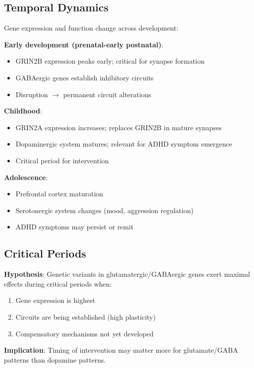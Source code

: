 \documentclass[12pt,letterpaper]{article}
\begin{document}
\subsection{Temporal Dynamics}

Gene expression and function change across development:

\textbf{Early development (prenatal-early postnatal)}:
\begin{itemize}
    \item GRIN2B expression peaks early; critical for synapse formation
    \item GABAergic genes establish inhibitory circuits
    \item Disruption $\rightarrow$ permanent circuit alterations
\end{itemize}

\textbf{Childhood}:
\begin{itemize}
    \item GRIN2A expression increases; replaces GRIN2B in mature synapses
    \item Dopaminergic system matures; relevant for ADHD symptom emergence
    \item Critical period for intervention
\end{itemize}

\textbf{Adolescence}:
\begin{itemize}
    \item Prefrontal cortex maturation
    \item Serotonergic system changes (mood, aggression regulation)
    \item ADHD symptoms may persist or remit
\end{itemize}

\subsection{Critical Periods}

\textbf{Hypothesis}: Genetic variants in glutamatergic/GABAergic genes exert maximal effects during critical periods when:
\begin{enumerate}
    \item Gene expression is highest
    \item Circuits are being established (high plasticity)
    \item Compensatory mechanisms not yet developed
\end{enumerate}

\textbf{Implication}: Timing of intervention may matter more for glutamate/GABA patterns than dopamine patterns.
\end{document}
